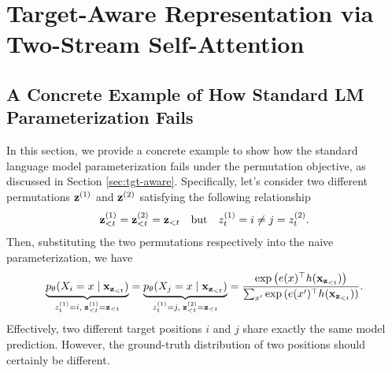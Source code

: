 \appendix

\section{Target-Aware Representation via Two-Stream Self-Attention}

\subsection{A Concrete Example of How Standard LM Parameterization Fails}
\label{sec:tgt-aware-example}

In this section, we provide a concrete example to show how the standard language model parameterization fails under the permutation objective, as discussed in Section \ref{sec:tgt-aware}.
Specifically, let's consider two different permutations ${\mathbf{z}}^{(1)}$ and ${\mathbf{z}}^{(2)}$ satisfying the following relationship
\[ 
  {\mathbf{z}}_{<t}^{(1)} = {\mathbf{z}}_{<t}^{(2)} = {\mathbf{z}}_{<t} \quad\text{but}\quad z_t^{(1)} = i \neq j = z_t^{(2)}.
\]
Then, substituting the two permutations respectively into the naive parameterization, we have
\begin{align*}
\underbrace{ p_\theta( X_{i} = x \mid {\mathbf{x}}_{{{\mathbf{z}}}_{<t}}) }_{ z_t^{(1)} = i,\; {\mathbf{z}}_{<t}^{(1)} = {\mathbf{z}}_{<t} } 
= 
\underbrace{ p_\theta( X_{j} = x \mid {\mathbf{x}}_{{{\mathbf{z}}}_{<t}}) }_{ z_t^{(1)} = j,\; {\mathbf{z}}_{<t}^{(2)} = {\mathbf{z}}_{<t} } 
= \frac
{\exp \left( {e(x)^\top h({\mathbf{x}}_{{{\mathbf{z}}}_{<t}})} \right)}
{\sum_{x'} \exp \left( {e(x')^\top h({\mathbf{x}}_{{{\mathbf{z}}}_{<t}})} \right)}.
\end{align*}
Effectively, two different target positions $i$ and $j$ share exactly the same model prediction. 
However, the ground-truth distribution of two positions should certainly be different. 


